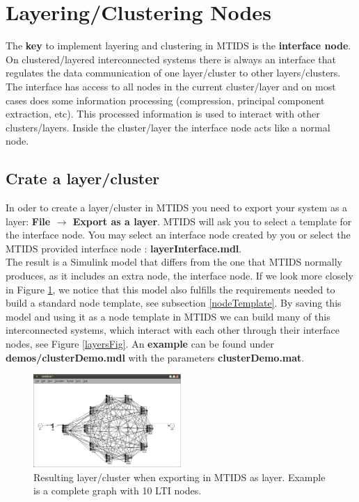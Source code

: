 \documentclass[a4paper,twoside, openright,12pt]{report}
\begin{document}
\section{Layering/Clustering Nodes} \label{layering}


The \textbf{key} to implement layering and clustering in MTIDS is the \textbf{interface node}. On clustered/layered interconnected systems there is always an interface
that regulates the data communication of one layer/cluster to other layers/clusters. The interface has access to all nodes in the current cluster/layer and 
on most cases does some information processing (compression, principal component extraction, etc). This processed information is used to interact with 
other clusters/layers. Inside the cluster/layer the interface node acts like a normal node.
\\

\subsection{Crate a layer/cluster}

In oder to create a layer/cluster in MTIDS you need to export your system as a layer: \textbf{File $\rightarrow$ Export as a layer}.
MTIDS will ask you to select a template for the interface node. You may select an interface node created by you or select the MTIDS provided
interface node : \textbf{layerInterface.mdl}.\\
The result is a Simulink model that differs from the one that MTIDS normally produces, as it includes an extra node, the interface node.
If we look more closely in Figure \ref{layerFig}, we notice that this model also fulfills the requirements needed to build a standard node template, see subsection \ref{nodeTemplate}.
By saving this model and using it as a node template in MTIDS we can build many of this interconnected systems, which interact with each other through their 
interface nodes, see Figure \ref{layersFig}. An \textbf{example} can be found under \textbf{demos/clusterDemo.mdl} with the parameters \textbf{clusterDemo.mat}.


\begin{figure}[htb]
\centering
\includegraphics[width=0.5\textwidth]{pics/screenLayer.eps}
\caption[MTIDS export as layer resulting model]{Resulting layer/cluster when exporting in MTIDS as layer. Example is a complete graph with 10 LTI nodes.}
\label{layerFig}
\end{figure}
\end{document}
